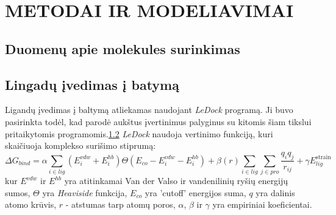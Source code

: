 

\section{METODAI IR MODELIAVIMAI}

\subsection{Duomenų apie molekules surinkimas}



\subsection{Lingadų įvedimas į batymą}

Ligandų įvedimas į baltymą atliekamas naudojant \emph{LeDock} programą. Ji buvo pasirinkta todėl, kad parodė aukštus įvertinimus palyginus su kitomis šiam tikslui pritaikytomis programomis.\ref{} \emph{LeDock} naudoja vertinimo funkciją, kuri skaičiuoja komplekso surišimo stiprumą: %
\begin{equation}
\Delta G_{bind}=\alpha \sum_{i \in lig}\left(E_{i}^{vdw}+E_{i}^{hb}\right) \Theta\left(E_{c o}-E_{i}^{v d w}-E_{i}^{h b}\right)+\beta(r) \sum_{i \in lig} \sum_{j \in pro} \frac{q_{i} q_{j}}{r_{i j}}+\gamma E_{lig}^{\text {strain}}

\end{equation}
kur $E^{vdw}$ ir $E^{hb}$ yra atitinkamai Van der Valso ir vandenilinių ryšių energijų sumos, $\Theta$ yra \emph{Heaviside} funkcija, $E_{co}$ yra 'cutoff'  energijos suma, $q$ yra dalinis atomo krūvis, $r$ - atstumas tarp atomų poros, $\alpha$, $\beta$ ir $\gamma$ yra empiriniai koeficientai.

